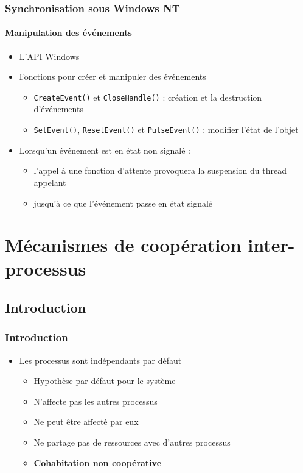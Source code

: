 \begin{frame}
\frametitle{Synchronisation sous Windows NT}
\framesubtitle{Manipulation des événements}
\begin{itemize}
\item L'API Windows
\item Fonctions pour créer et manipuler des événements
\begin{itemize}
\item \texttt{CreateEvent()} et \texttt{CloseHandle()} : création et la destruction d'événements
\item \texttt{SetEvent()}, \texttt{ResetEvent()} et \texttt{PulseEvent()} : modifier l'état de l'objet
\end{itemize}
\item Lorsqu'un événement est en état non signalé :
\begin{itemize}
\item l'appel à une fonction d'attente provoquera la suspension du thread appelant
\item jusqu'à ce que l'événement passe en état signalé
\end{itemize}
\end{itemize}
\end{frame}


\section{Mécanismes de coopération inter-processus}
\subsection{Introduction}

\begin{frame}
\frametitle{Introduction}
\begin{itemize}
\item Les processus sont indépendants par défaut
\begin{itemize}
\item Hypothèse par défaut pour le système
\item N’affecte pas les autres processus
\item Ne peut être affecté par eux
\item Ne partage pas de ressources avec d’autres processus
\item \textbf{Cohabitation non coopérative}
\end{itemize}
\end{itemize}
\end{frame}

